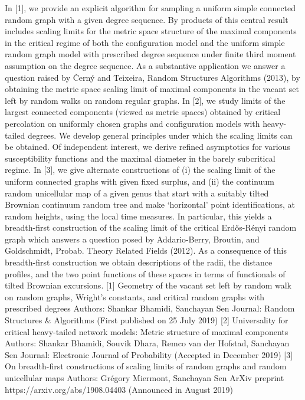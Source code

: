 In [1], we provide an explicit algorithm for sampling a uniform simple connected random graph with a given degree sequence. By products of this central result includes scaling limits for the metric space structure of the maximal components in the critical regime of both the configuration model and the uniform simple random graph model with prescribed degree sequence under finite third moment assumption on the degree sequence. As a substantive application we answer a question raised by Černý and Teixeira, Random Structures Algorithms (2013), by obtaining the metric space scaling limit of maximal components in the vacant set left by random walks on random regular graphs.  In [2], we study limits of the largest connected components (viewed as metric spaces) obtained by critical percolation on uniformly chosen graphs and configuration models with heavy-tailed degrees. We develop general principles under which the scaling limits can be obtained. Of independent interest, we derive refined asymptotics for various susceptibility functions and the maximal diameter in the barely subcritical regime.  In [3], we give alternate constructions of (i) the scaling limit of the uniform connected graphs with given fixed surplus, and (ii) the continuum random unicellular map of a given genus that start with a suitably tilted Brownian continuum random tree and make `horizontal' point identifications, at random heights, using the local time measures. In particular, this yields a breadth-first construction of the scaling limit of the critical Erdős-Rényi random graph which answers a question posed by Addario-Berry, Broutin, and Goldschmidt, Probab. Theory Related Fields (2012). As a consequence of this breadth-first construction we obtain descriptions of the radii, the distance profiles, and the two point functions of these spaces in terms of functionals of tilted Brownian excursions.    [1] Geometry of the vacant set left by random walk on random graphs, Wright's constants, and critical random graphs with prescribed degrees Authors: Shankar Bhamidi, Sanchayan Sen Journal: Random Structures & Algorithms (First published on 25 July 2019)  [2] Universality for critical heavy-tailed network models: Metric structure of maximal components Authors: Shankar Bhamidi, Souvik Dhara, Remco van der Hofstad, Sanchayan Sen Journal: Electronic Journal of Probability (Accepted in December 2019)  [3] On breadth-first constructions of scaling limits of random graphs and random unicellular maps Authors: Grégory Miermont, Sanchayan Sen ArXiv preprint https://arxiv.org/abs/1908.04403 (Announced in August 2019)


